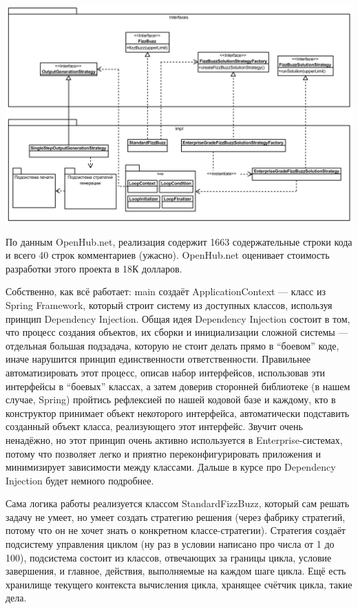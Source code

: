 \documentclass[a5paper]{article}
\begin{document}
\begin{center}
	\includegraphics[width=\textwidth]{fizzBuzzArchitecture.png}
\end{center}

По данным OpenHub.net, реализация содержит 1663 содержательные строки кода и всего 40 строк комментариев (ужасно). OpenHub.net оценивает стоимость разработки этого проекта в 18К долларов.

Собственно, как всё работает: main создаёт ApplicationContext --- класс из Spring Framework, который строит систему из доступных классов, используя принцип Dependency Injection. Общая идея Dependency Injection состоит в том, что процесс создания объектов, их сборки и инициализации сложной системы --- отдельная большая подзадача, которую не стоит делать прямо в ``боевом'' коде, иначе нарушится принцип единственности ответственности. Правильнее автоматизировать этот процесс, описав набор интерфейсов, использовав эти интерфейсы в ``боевых'' классах, а затем доверив сторонней библиотеке (в нашем случае, Spring) пройтись рефлексией по нашей кодовой базе и каждому, кто в конструктор принимает объект некоторого интерфейса, автоматически подставить созданный объект класса, реализующего этот интерфейс. Звучит очень ненадёжно, но этот принцип очень активно используется в Enterprise-системах, потому что позволяет легко и приятно переконфигурировать приложения и минимизирует зависимости между классами. Дальше в курсе про Dependency Injection будет немного подробнее.

Сама логика работы реализуется классом StandardFizzBuzz, который сам решать задачу не умеет, но умеет создать стратегию решения (через фабрику стратегий, потому что он не хочет знать о конкретном классе-стратегии). Стратегия создаёт подсистему управления циклом (ну раз в условии написано про числа от 1 до 100), подсистема состоит из классов, отвечающих за границы цикла, условие завершения, и главное, действия, выполняемые на каждом шаге цикла. Ещё есть хранилище текущего контекста вычисления цикла, хранящее счётчик цикла, такие дела.
\end{document}
